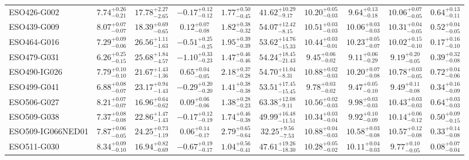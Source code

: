 \documentclass[onecolumn]{mn2e}
\begin{document}
\begin{landscape}
{\begin{center}
\begin{longtable}{lccccccccc}
ESO426-G002 & $7.74_{-0.21}^{+0.26}$ & $17.78_{-2.65}^{+2.27}$ & $-0.17_{-0.12}^{+0.12}$ & $1.77_{-0.45}^{+0.50}$ &$41.62_{-9.17}^{+10.29}$ & $10.20_{-0.03}^{+0.05}$ & $9.64_{-0.18}^{+0.13}$ & $10.06_{-0.05}^{+0.07}$ & $0.64_{-0.11}^{+0.13}$ \\
ESO439-G009 & $8.07_{-0.07}^{+0.07}$ & $18.39_{-0.65}^{+0.69}$ & $0.12_{-0.08}^{+0.07}$ & $1.82_{-0.32}^{+0.38}$ &$54.07_{-8.15}^{+12.42}$ & $10.51_{-0.03}^{+0.03}$ & $10.06_{-0.03}^{+0.03}$ & $10.31_{-0.05}^{+0.04}$ & $0.52_{-0.05}^{+0.04}$ \\
ESO464-G016 & $7.29_{-0.06}^{+0.09}$ & $26.56_{-1.63}^{+1.11}$ & $-0.51_{-0.25}^{+0.25}$ & $1.95_{-0.39}^{+0.39}$ &$53.62_{-15.33}^{+14.76}$ & $10.44_{-0.01}^{+0.03}$ & $10.23_{-0.07}^{+0.05}$ & $10.02_{-0.10}^{+0.15}$ & $0.17_{-0.10}^{+0.16}$ \\
ESO479-G031 & $6.26_{-0.15}^{+0.25}$ & $25.68_{-4.57}^{+1.84}$ & $-1.10_{-0.23}^{+0.33}$ & $1.47_{-0.46}^{+0.46}$ &$54.24_{-21.43}^{+18.45}$ & $9.45_{-0.02}^{+0.06}$ & $9.11_{-0.29}^{+0.06}$ & $9.19_{-0.05}^{+0.20}$ & $0.39_{-0.08}^{+0.32}$ \\
ESO490-IG026 & $7.79_{-0.10}^{+0.10}$ & $21.67_{-1.36}^{+1.43}$ & $0.65_{-0.05}^{+0.04}$ & $2.18_{-0.28}^{+0.37}$ &$54.70_{-8.31}^{+11.04}$ & $10.88_{-0.03}^{+0.02}$ & $10.20_{-0.08}^{+0.07}$ & $10.78_{-0.05}^{+0.03}$ & $0.72_{-0.06}^{+0.04}$ \\
ESO499-G041 & $6.88_{-0.07}^{+0.08}$ & $23.17_{-1.43}^{+0.94}$ & $-0.29_{-0.20}^{+0.20}$ & $1.41_{-0.38}^{+0.38}$ &$53.51_{-15.45}^{+17.45}$ & $9.78_{-0.02}^{+0.03}$ & $9.47_{-0.10}^{+0.05}$ & $9.49_{-0.08}^{+0.11}$ & $0.34_{-0.09}^{+0.16}$ \\
ESO506-G027 & $8.21_{-0.07}^{+0.07}$ & $16.96_{-0.62}^{+0.64}$ & $0.09_{-0.06}^{+0.06}$ & $1.38_{-0.23}^{+0.28}$ &$63.38_{-9.11}^{+12.08}$ & $10.56_{-0.03}^{+0.02}$ & $9.98_{-0.03}^{+0.03}$ & $10.43_{-0.03}^{+0.03}$ & $0.64_{-0.03}^{+0.03}$ \\
ESO509-G038 & $7.37_{-0.08}^{+0.08}$ & $22.86_{-1.43}^{+1.47}$ & $-0.17_{-0.19}^{+0.12}$ & $1.74_{-0.38}^{+0.46}$ &$49.99_{-11.51}^{+16.48}$ & $10.34_{-0.04}^{+0.03}$ & $9.92_{-0.09}^{+0.10}$ & $10.14_{-0.12}^{+0.06}$ & $0.50_{-0.15}^{+0.09}$ \\
ESO509-IG066NED01 & $7.87_{-0.05}^{+0.06}$ & $24.25_{-1.19}^{+0.73}$ & $0.06_{-0.17}^{+0.14}$ & $2.79_{-0.64}^{+0.65}$ &$32.25_{-7.53}^{+9.56}$ & $10.88_{-0.03}^{+0.04}$ & $10.58_{-0.08}^{+0.03}$ & $10.57_{-0.08}^{+0.12}$ & $0.33_{-0.08}^{+0.14}$ \\
ESO511-G030 & $8.34_{-0.10}^{+0.09}$ & $16.94_{-0.69}^{+0.82}$ & $-0.67_{-0.17}^{+0.19}$ & $1.04_{-0.41}^{+0.56}$ &$47.61_{-18.30}^{+19.26}$ & $10.28_{-0.02}^{+0.05}$ & $10.11_{-0.03}^{+0.04}$ & $9.77_{-0.05}^{+0.10}$ & $0.08_{-0.04}^{+0.07}$ \\

\end{longtable}
\end{center}}
\end{landscape}
\end{document}
